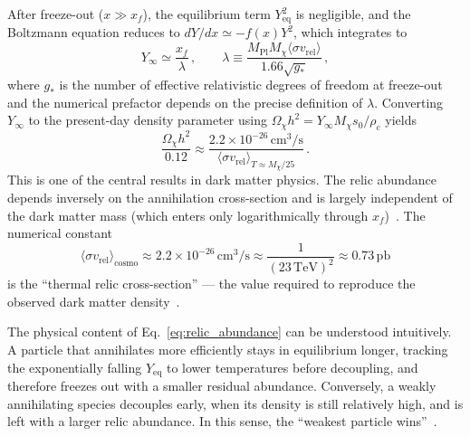 After freeze-out ($x \gg x_f$), the equilibrium term $Y_\mathrm{eq}^2$ is negligible, and the Boltzmann equation reduces to $dY/dx \simeq -f(x) Y^2$, which integrates to~\cite{Cirelli:2024ssz}
\begin{equation}
	Y_\infty \simeq \frac{x_f}{\lambda} \,, \qquad \lambda \equiv \frac{M_\mathrm{Pl} M_\chi \langle \sigma v_\mathrm{rel} \rangle}{1.66 \sqrt{g_*}} \,,
	\label{eq:Y_infty}
\end{equation}
where $g_*$ is the number of effective relativistic degrees of freedom at freeze-out and the numerical prefactor depends on the precise definition of $\lambda$. Converting $Y_\infty$ to the present-day density parameter using $\Omega_\chi h^2 = Y_\infty M_\chi s_0 / \rho_c$ yields~\cite{Cirelli:2024ssz}
\begin{equation}
	\frac{\Omega_\chi h^2}{0.12} \approx \frac{2.2 \times 10^{-26} \, \mathrm{cm}^3/\mathrm{s}}{\langle \sigma v_\mathrm{rel} \rangle_{T \approx M_\chi/25}} \,.
	\label{eq:relic_abundance}
\end{equation}
This is one of the central results in dark matter physics.
The relic abundance depends inversely on the annihilation cross-section and is largely independent of the dark matter mass (which enters only logarithmically through $x_f$)~\cite{Cirelli:2024ssz}.
The numerical constant
\begin{equation}
	\langle \sigma v_\mathrm{rel} \rangle_\mathrm{cosmo} \approx 2.2 \times 10^{-26} \, \mathrm{cm}^3/\mathrm{s} \approx \frac{1}{(23 \, \mathrm{TeV})^2} \approx 0.73 \, \mathrm{pb}
	\label{eq:sigma_v_cosmo}
\end{equation}
is the ``thermal relic cross-section'' --- the value required to reproduce the observed dark matter density~\cite{Steigman:2012nb,Cirelli:2024ssz}.

The physical content of Eq.~\eqref{eq:relic_abundance} can be understood intuitively.
A particle that annihilates more efficiently stays in equilibrium longer, tracking the exponentially falling $Y_\mathrm{eq}$ to lower temperatures before decoupling, and therefore freezes out with a smaller residual abundance.
Conversely, a weakly annihilating species decouples early, when its density is still relatively high, and is left with a larger relic abundance.
In this sense, the ``weakest particle wins''~\cite{Cirelli:2024ssz}.

